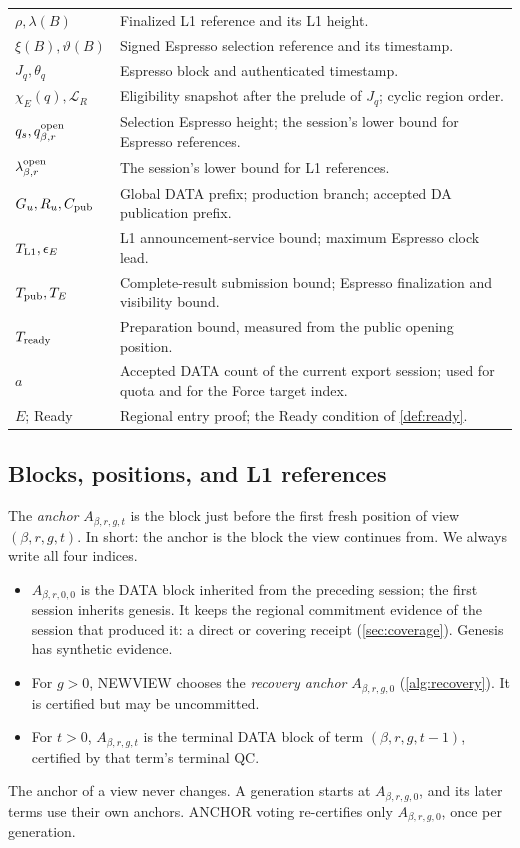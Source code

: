 \documentclass[11pt,a4paper]{article}
\newcommand{\defterm}[1]{\textcolor{rrBlue}{\textit{#1}}}
\begin{document}
\begin{table}[htbp]
\begin{tabularx}{\linewidth}{@{}p{.32\linewidth}Y@{}}
$\rho,\lambda(B)$ & Finalized L1 reference and its L1 height.\\
$\xi(B),\vartheta(B)$ & Signed Espresso selection reference and its timestamp.\\
$J_q,\theta_q$ & Espresso block and authenticated timestamp.\\
$\chi_E(q),\mathcal L_R$ & Eligibility snapshot after the prelude of $J_q$; cyclic region order.\\
$q_s,q_{\beta,r}^{\rm open}$ & Selection Espresso height; the session's lower bound for Espresso references.\\
$\lambda_{\beta,r}^{\rm open}$ & The session's lower bound for L1 references.\\
$G_u,R_u,C_{\rm pub}$ & Global DATA prefix; production branch; accepted DA publication prefix.\\
$T_{\rm L1},\epsilon_E$ & L1 announcement-service bound; maximum Espresso clock lead.\\
$T_{\rm pub},T_E$ & Complete-result submission bound; Espresso finalization and visibility bound.\\
$T_{\rm ready}$ & Preparation bound, measured from the public opening position.\\
$a$ & Accepted DATA count of the current export session; used for quota and for the Force target index.\\
$E$; Ready & Regional entry proof; the Ready condition of \cref{def:ready}.\\
\bottomrule\end{tabularx}
\end{table}

\subsection{Blocks, positions, and L1 references}
\label{sec:blocks}
The \defterm{anchor} $A_{\beta,r,g,t}$ is the block just before the first
fresh position of view $(\beta,r,g,t)$. In short: the anchor is the block
the view continues from. We always write all four indices.
\begin{itemize}
\item $A_{\beta,r,0,0}$ is the DATA block inherited from the preceding
session; the first session inherits genesis. It keeps the regional
commitment evidence of the session that produced it: a direct or
covering receipt (\cref{sec:coverage}). Genesis has synthetic evidence.
\item For $g>0$, NEWVIEW chooses the \defterm{recovery anchor}
$A_{\beta,r,g,0}$ (\cref{alg:recovery}). It is certified but may be
uncommitted.
\item For $t>0$, $A_{\beta,r,g,t}$ is the terminal DATA block of term
$(\beta,r,g,t-1)$, certified by that term's terminal QC.
\end{itemize}
The anchor of a view never changes. A generation starts at
$A_{\beta,r,g,0}$, and its later terms use their own anchors. ANCHOR
voting re-certifies only $A_{\beta,r,g,0}$, once per generation.
\end{document}
